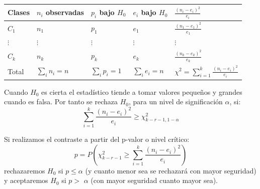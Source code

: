 \documentclass[
  spanish,
  10pt,
]{book}
\newcounter{none} %
\theoremstyle{break}
\theoremstyle{nonumberplain}
\begin{document}
{\def\LTcaptype{none} %
\begin{longtable}[]{@{}
  >{\raggedright\arraybackslash}p{}
  >{\raggedright\arraybackslash}p{}
  >{\raggedright\arraybackslash}p{}
  >{\raggedright\arraybackslash}p{}
  >{\raggedright\arraybackslash}p{}@{}}
\toprule\noalign{}
\begin{minipage}[b]{\linewidth}\raggedright
Clases
\end{minipage} & \begin{minipage}[b]{\linewidth}\raggedright
\(n_{i}\) observadas
\end{minipage} & \begin{minipage}[b]{\linewidth}\raggedright
\(p_{i}\) bajo \(H_0\)
\end{minipage} & \begin{minipage}[b]{\linewidth}\raggedright
\(e_{i}\) bajo \(H_0\)
\end{minipage} & \begin{minipage}[b]{\linewidth}\raggedright
\(\frac{(n_{i}-e_{i})^2}{e_{i}}\)
\end{minipage} \\
\midrule\noalign{}
\endhead
\bottomrule\noalign{}
\endlastfoot
\(C_1\) & \(n_1\) & \(p_1\) & \(e_1\) & \(\frac{(n_1-e_1)^2}{e_1}\) \\
\(\vdots\) & \(\vdots\) & \(\vdots\) & \(\vdots\) & \(\vdots\) \\
\(C_{k}\) & \(n_{k}\) & \(p_{k}\) & \(e_{k}\) & \(\frac{(n_{k}-e_{k})^2}{e_{k}}\) \\
Total & \(\sum_{i}n_{i}=n\) & \(\sum_{i}p_{i}=1\) & \(\sum_{i}e_{i}=n\) & \(\chi^2=\sum_{i=1}^{k}\frac{(n_{i}-e_{i})^2}{e_{i}}\) \\
\end{longtable}
}

Cuando \(H_0\) es cierta el estadístico tiende a tomar valores pequeños y grandes cuando es falsa.
Por tanto se rechaza \(H_0\), para un nivel de significación \(\alpha\), si:
\[\sum_{i=1}^{k}\frac{(n_{i}-e_{i})^2}{e_{i}}\geq \chi_{k-r-1,1-\alpha}^2\]

Si realizamos el contraste a partir del p-valor o nivel crítico:
\[p=P\left(  {\chi_{k-r-1}^2\geq \sum \limits_{i=1}^{k}{\frac{(n_{i}-e_{i})^2}{e_{i}}}}\right)\]
rechazaremos \(H_0\) si \(p\leq \alpha\) (y cuanto menor sea se rechazará con mayor seguridad) y aceptaremos \(H_0\) si \(p>\) \(\alpha\) (con mayor seguridad cuanto mayor sea).
\end{document}
